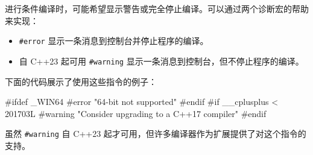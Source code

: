 
进行条件编译时，可能希望显示警告或完全停止编译。可以通过两个诊断宏的帮助来实现：

\begin{itemize}
\item
\verb|#error| 显示一条消息到控制台并停止程序的编译。

\item
自 C++23 起可用 \verb|#warning| 显示一条消息到控制台，但不停止程序的编译。
\end{itemize}

下面的代码展示了使用这些指令的例子：

\begin{cpp}
#ifdef _WIN64
#error "64-bit not supported"
#endif
#if __cplusplus < 201703L
#warning "Consider upgrading to a C++17 compiler"
#endif
\end{cpp}

虽然 \verb|#warning| 自 C++23 起才可用，但许多编译器作为扩展提供了对这个指令的支持。


